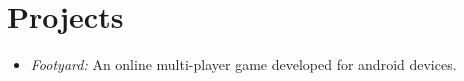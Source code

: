 \section{Projects}
\begin{multicols}{2}
\begin{itemize}
        \item { \emph{Footyard:} An online multi-player game developed for
                android devices.}
\end{itemize}
\end{multicols}

